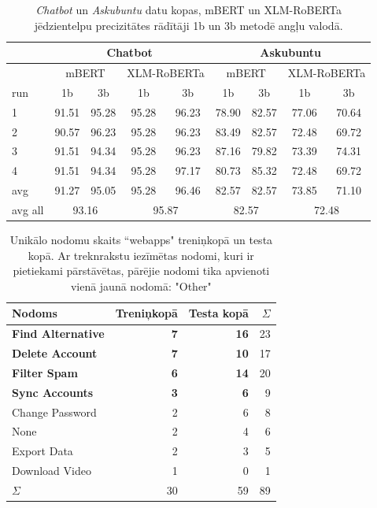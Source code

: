 \begin{table}[htbp]
  \centering
  \caption{\textit{Chatbot} un \textit{Askubuntu} datu kopas, mBERT un XLM-RoBERTa jēdzientelpu precizitātes rādītāji 1b un 3b metodē angļu valodā.}
    \begin{tabular}{l|cc|cc|cc|cc} \toprule
          & \multicolumn{4}{c|}{Chatbot}   & \multicolumn{4}{c}{Askubuntu} \\\midrule
          & \multicolumn{2}{c|}{mBERT} & \multicolumn{2}{c|}{XLM-RoBERTa} & \multicolumn{2}{c|}{mBERT} & \multicolumn{2}{c}{XLM-RoBERTa} \\
    run   & \multicolumn{1}{c}{1b} & \multicolumn{1}{c|}{3b} & \multicolumn{1}{c}{1b} & \multicolumn{1}{c|}{3b} & \multicolumn{1}{c}{1b} & \multicolumn{1}{c|}{3b} & \multicolumn{1}{c}{1b} & \multicolumn{1}{c}{3b} \\\midrule
    1     & 91.51 & 95.28 & 95.28 & 96.23 & 78.90 & 82.57 & 77.06 & 70.64 \\
    2     & 90.57 & 96.23 & 95.28 & 96.23 & 83.49 & 82.57 & 72.48 & 69.72 \\
    3     & 91.51 & 94.34 & 95.28 & 96.23 & 87.16 & 79.82 & 73.39 & 74.31 \\
    4     & 91.51 & 94.34 & 95.28 & 97.17 & 80.73 & 85.32 & 72.48 & 69.72 \\\midrule
    avg   & 91.27 & 95.05 & 95.28 & 96.46 & 82.57 & 82.57 & 73.85 & 71.10 \\
    avg all & \multicolumn{2}{c|}{93.16} & \multicolumn{2}{c|}{95.87} & \multicolumn{2}{c|}{82.57} & \multicolumn{2}{c}{72.48} \\\bottomrule
    \end{tabular}%
  \label{tab:13b}%
\end{table}%




\begin{table}[htbp]
  \centering
  \caption{Unikālo nodomu skaits ``webapps" treniņkopā un testa kopā. Ar treknrakstu iezīmētas nodomi, kuri ir pietiekami pārstāvētas, pārējie nodomi tika apvienoti vienā jaunā nodomā: "Other"}
    \begin{tabular}{lrrr} \toprule
    Nodoms & Treniņkopā & Testa kopā & $\Sigma$ \\\midrule
    \textbf{Find Alternative} & \textbf{7} & \textbf{16} & 23\\
    \textbf{Delete Account} & \textbf{7} & \textbf{10} & 17\\
    \textbf{Filter Spam} & \textbf{6} & \textbf{14} & 20 \\
    \textbf{Sync Accounts} & \textbf{3} & \textbf{6} & 9 \\
    Change Password & 2     & 6 & 8\\
    None  & 2     & 4 & 6\\
    Export Data & 2     & 3 & 5 \\
    Download Video & 1     & 0 & 1\\
    $\Sigma$ & 30    & 59 & 89 \\\bottomrule
    \end{tabular}%
  \label{tab:webapps-labels}%
\end{table}%


